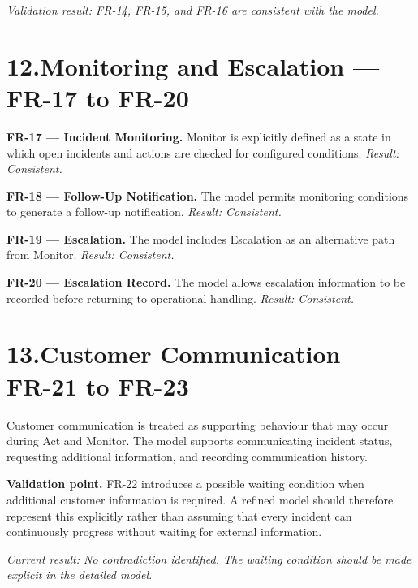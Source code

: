 \documentclass[11pt,a4paper]{article}
\begin{document}
\textit{Validation result: FR-14, FR-15, and FR-16 are consistent with the model.}

\section*{12.\enspace Monitoring and Escalation — FR-17 to FR-20}

\textbf{FR-17 — Incident Monitoring.} Monitor is explicitly defined as a state in which open incidents and actions are checked for configured conditions. \textit{Result: Consistent.}

\textbf{FR-18 — Follow-Up Notification.} The model permits monitoring conditions to generate a follow-up notification. \textit{Result: Consistent.}

\textbf{FR-19 — Escalation.} The model includes Escalation as an alternative path from Monitor. \textit{Result: Consistent.}

\textbf{FR-20 — Escalation Record.} The model allows escalation information to be recorded before returning to operational handling. \textit{Result: Consistent.}

\section*{13.\enspace Customer Communication — FR-21 to FR-23}

Customer communication is treated as supporting behaviour that may occur during Act and Monitor. The model supports communicating incident status, requesting additional information, and recording communication history.

\textbf{Validation point.} FR-22 introduces a possible waiting condition when additional customer information is required. A refined model should therefore represent this explicitly rather than assuming that every incident can continuously progress without waiting for external information.

\textit{Current result: No contradiction identified. The waiting condition should be made explicit in the detailed model.}

\end{document}
